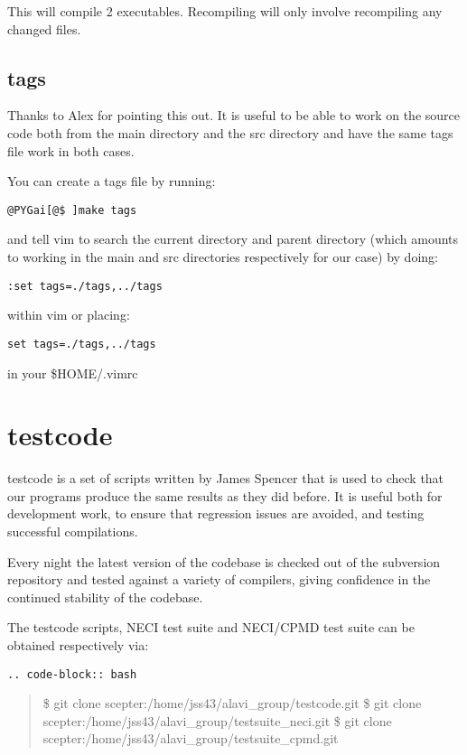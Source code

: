 \documentclass[openany,a4paper,10pt,english]{manual}
\begin{document}
This will compile 2 executables.  Recompiling will only involve recompiling
any changed files.


\subsection{tags}

Thanks to Alex for pointing this out.  It is useful to be able to work on the
source code both from the main directory and the src directory and have the
same tags file work in both cases.

You can create a tags file by running:

\begin{Verbatim}[commandchars=@\[\]]
@PYGai[@$ ]make tags
\end{Verbatim}

and tell vim to search the current directory and parent directory (which
amounts to working in the main and src directories respectively for our case)
by doing:

\begin{Verbatim}[commandchars=@\[\]]
:set tags=./tags,../tags
\end{Verbatim}

within vim or placing:

\begin{Verbatim}[commandchars=@\[\]]
set tags=./tags,../tags
\end{Verbatim}

in your \$HOME/.vimrc


\section{testcode}

testcode is a set of scripts written by James Spencer that is used to
check that our programs produce the same results as they did before.
It is useful both for development work, to ensure that regression issues
are avoided, and testing successful compilations.

Every night the latest version of the codebase is checked out of the
subversion repository and tested against a variety of compilers, giving
confidence in the continued stability of the codebase.

The testcode scripts, NECI test suite and NECI/CPMD test suite can
be obtained respectively via:

\begin{Verbatim}[commandchars=@\[\]]
.. code-block:: bash
\end{Verbatim}
\begin{quote}

\$ git clone scepter:/home/jss43/alavi\_group/testcode.git
\$ git clone scepter:/home/jss43/alavi\_group/testsuite\_neci.git
\$ git clone scepter:/home/jss43/alavi\_group/testsuite\_cpmd.git
\end{quote}
\end{document}

